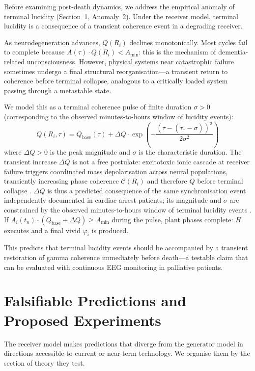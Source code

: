 \documentclass[12pt]{article}
\begin{document}
Before examining post-death dynamics, we address the empirical anomaly of terminal lucidity (Section~1, Anomaly~2). Under the receiver model, terminal lucidity is a consequence of a transient coherence event in a degrading receiver.

As neurodegeneration advances, $Q(R_i)$ declines monotonically. Most cycles fail to complete because $A(\tau) \cdot Q(R_i) < A_{\min}$: this is the mechanism of dementia-related unconsciousness. However, physical systems near catastrophic failure sometimes undergo a final structural reorganisation---a transient return to coherence before terminal collapse, analogous to a critically loaded system passing through a metastable state.

We model this as a terminal coherence pulse of finite duration $\sigma > 0$ (corresponding to the observed minutes-to-hours window of lucidity events):
\begin{equation}
    Q(R_i, \tau) = Q_{\mathrm{base}}(\tau)
    + \Delta Q\cdot\exp\!\left(-\frac{(\tau - (\tau_{\dagger} - \sigma))^2}{2\sigma^2}\right)
\end{equation}
where $\Delta Q > 0$ is the peak magnitude and $\sigma$ is the characteristic duration. The transient increase $\Delta Q$ is not a free postulate: excitotoxic ionic cascade at receiver failure triggers coordinated mass depolarisation across neural populations, transiently increasing phase coherence $\mathcal{C}(R_i)$ and therefore $Q$ before terminal collapse \cite{borjigin2023}. $\Delta Q$ is thus a predicted consequence of the same synchronisation event independently documented in cardiac arrest patients; its magnitude and $\sigma$ are constrained by the observed minutes-to-hours window of terminal lucidity events \cite{nahm2012}. If $A_i(t_n)\cdot(Q_{\mathrm{base}}+\Delta Q)\geq A_{\min}$ during the pulse, plant phases complete: $H$ executes and a final vivid $\varphi_i$ is produced.

This predicts that terminal lucidity events should be accompanied by a transient restoration of gamma coherence immediately before death---a testable claim that can be evaluated with continuous EEG monitoring in palliative patients.

\section{Falsifiable Predictions and Proposed Experiments}

The receiver model makes predictions that diverge from the generator model in directions accessible to current or near-term technology. We organise them by the section of theory they test.
\end{document}
